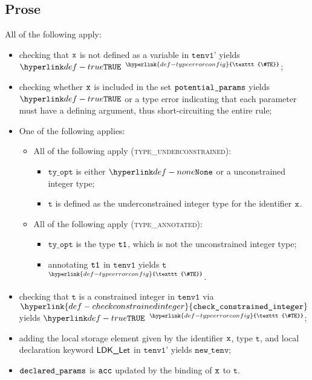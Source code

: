 \documentclass{book}
\newcommand\TypeErrorConfig[0]{\hyperlink{def-typeerrorconfig}{\texttt{\#TE}}}
\newcommand\ProseOrTypeError[0]{\hyperlink{def-proseortypeerror}{$^{\TypeErrorConfig}$}}
\newcommand\checkconstrainedinteger[0]{\hyperlink{def-checkconstrainedinteger}{\texttt{check\_constrained\_integer}}}
\newcommand\newtenv[0]{\texttt{new\_tenv}}
\newcommand\tenvone[0]{\texttt{tenv1}}
\newcommand\tenvonep[0]{\texttt{tenv1'}}
\newcommand\vt[0]{\texttt{t}}
\newcommand\tyopt[0]{\texttt{ty\_opt}}
\begin{document}
\subsection{Prose}
All of the following apply:
\begin{itemize}
  \item checking that $\texttt{x}$ is not defined as a variable in $\tenvonep$ yields $\True$ \ProseOrTypeError;
  \item checking whether $\texttt{x}$ is included in the set $\texttt{potential\_params}$ yields $\True$ or a type error
        indicating that each parameter must have a defining argument, thus short-circuiting the entire rule;
  \item One of the following applies:
  \begin{itemize}
    \item All of the following apply (\textsc{type\_underconstrained}):
    \begin{itemize}
      \item $\tyopt$ is either $\None$ or a unconstrained integer type;
      \item $\vt$ is defined as the underconstrained integer type for the identifier $\texttt{x}$.
    \end{itemize}

    \item All of the following apply (\textsc{type\_annotated}):
    \begin{itemize}
      \item $\tyopt$ is the type $\texttt{t1}$, which is not the unconstrained integer type;
      \item annotating $\texttt{t1}$ in $\tenvone$ yields $\vt$ \ProseOrTypeError.
    \end{itemize}
  \end{itemize}
  \item checking that $\vt$ is a constrained integer in $\tenvone$ via $\checkconstrainedinteger$
        yields $\True$ \ProseOrTypeError;
  \item adding the local storage element given by the identifier $\texttt{x}$, type $\vt$, and local declaration keyword
        $\textsf{LDK\_Let}$ in $\tenvonep$ yields $\newtenv$;
  \item $\texttt{declared\_params}$ is $\texttt{acc}$ updated by the binding of $\texttt{x}$ to $\vt$.
\end{itemize}
\end{document}

